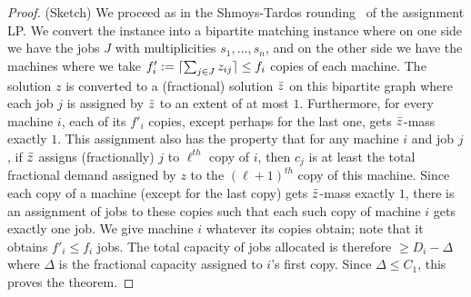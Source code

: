 	\begin{proof} (Sketch) We proceed as in  the Shmoys-Tardos rounding~\cite{ShmoysT93} of the assignment LP. 
	We convert the instance into a bipartite matching instance where on one side we have the jobs $J$ with
		multiplicities $s_1,\ldots,s_n$, and on the other side we have the machines where we take $f'_i := \lceil\sum_{j\in J} z_{ij}\rceil \le f_i$ copies of each machine.
		The solution $z$ is converted to a (fractional) solution $\bar{z}$ on this bipartite graph where each job $j$ 
		is assigned  by $\bar{z}$ to an extent of at most $1$. Furthermore, for every machine $i$, each of its $f'_i$ copies, except perhaps for the last one, 
		 gets $\bar{z}$-mass exactly $1$.  This assignment also has the property that for any machine $i$ and job $j$, 
		if  $\bar{z}$ assigns (fractionally) $j$ to $\ell^{th}$ copy of $i$, then $c_j$ is at least the total fractional demand assigned by $z$ to 
		the $(\ell+1)^{th}$ copy of this machine. 
		Since each copy of a machine (except for the last copy) gets $\bar{z}$-mass exactly $1$, there is an assignment of jobs to these copies such that each such copy of machine $i$ gets exactly one job. We give machine $i$ whatever its copies obtain; note that it obtains $f'_i \leq f_i$ jobs.
		The total capacity of jobs allocated is therefore $\ge D_i - \Delta$ where $\Delta$ is the fractional capacity assigned to $i$'s first copy. Since $\Delta\leq C_1$,  this proves the theorem.
%		
%	
%		
	\end{proof}
	

